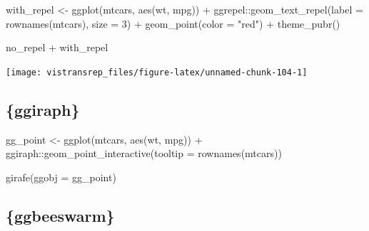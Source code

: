 \documentclass[]{book}
\newenvironment{Shaded}{}{}
\newcommand{\DataTypeTok}[1]{#1}
\newcommand{\DecValTok}[1]{#1}
\newcommand{\KeywordTok}[1]{\textcolor[rgb]{0.00,0.00,1.00}{#1}}
\newcommand{\NormalTok}[1]{#1}
\newcommand{\OperatorTok}[1]{#1}
\newcommand{\StringTok}[1]{\textcolor[rgb]{0.00,0.50,0.50}{#1}}
\begin{document}
\begin{Shaded}
\begin{Highlighting}[]
\NormalTok{with_repel <-}\StringTok{ }\KeywordTok{ggplot}\NormalTok{(mtcars, }\KeywordTok{aes}\NormalTok{(wt, mpg)) }\OperatorTok{+}
\StringTok{  }\NormalTok{ggrepel}\OperatorTok{::}\KeywordTok{geom_text_repel}\NormalTok{(}\DataTypeTok{label =} \KeywordTok{rownames}\NormalTok{(mtcars), }\DataTypeTok{size =} \DecValTok{3}\NormalTok{) }\OperatorTok{+}
\StringTok{  }\KeywordTok{geom_point}\NormalTok{(}\DataTypeTok{color =} \StringTok{"red"}\NormalTok{) }\OperatorTok{+}
\StringTok{  }\KeywordTok{theme_pubr}\NormalTok{()}
\end{Highlighting}
\end{Shaded}

\begin{Shaded}
\begin{Highlighting}[]
\NormalTok{no_repel }\OperatorTok{+}\StringTok{ }\NormalTok{with_repel}
\end{Highlighting}
\end{Shaded}

\begin{flushright}\texttt{[image: vistransrep\_files/figure-latex/unnamed-chunk-104-1]} \end{flushright}

\hypertarget{ggiraph}{%
\subsection{\{ggiraph\}}\label{ggiraph}}

\begin{Shaded}
\begin{Highlighting}[]
\NormalTok{gg_point <-}\StringTok{ }\KeywordTok{ggplot}\NormalTok{(mtcars, }\KeywordTok{aes}\NormalTok{(wt, mpg)) }\OperatorTok{+}
\StringTok{  }\NormalTok{ggiraph}\OperatorTok{::}\KeywordTok{geom_point_interactive}\NormalTok{(}\DataTypeTok{tooltip =} \KeywordTok{rownames}\NormalTok{(mtcars))}

\KeywordTok{girafe}\NormalTok{(}\DataTypeTok{ggobj =}\NormalTok{ gg_point)}
\end{Highlighting}
\end{Shaded}

\hypertarget{htmlwidget-63e63ac58891cc86e873}{}

\hypertarget{ggbeeswarm}{%
\subsection{\{ggbeeswarm\}}\label{ggbeeswarm}}
\end{document}
